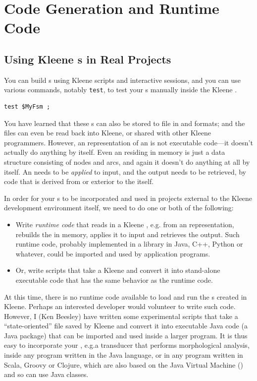 \chapter{Code Generation and Runtime Code}

\label{chapt:coderuntime}

\section{Using Kleene \fsm{}s in Real Projects}

 
You can build \fsm{}s using Kleene scripts and interactive  sessions,
and you can
use various commands, notably \texttt{test}, to 
test your \fsm{}s manually inside the Kleene .


\begin{Verbatim}
test $MyFsm ;
\end{Verbatim}

\noindent
You have learned that these \fsm{}s can also be stored to file in  and \xml{}
formats; and the \xml{} files can even be read back into Kleene, or shared with other
Kleene programmers.  However, an  representation of
an \fsm{} is not executable code---it doesn't actually do anything by itself.  Even an
\fsm{} residing in memory is just a data structure consisting of nodes and arcs, and again it
doesn't do anything at all by itself.  An \fsm{} needs to be \emph{applied} to input, and
the output needs to be retrieved, by code that is derived from or exterior to the \fsm{} itself.

In order for your \fsm{}s to
be incorporated and used in projects external to the Kleene development environment itself,
we need to do one or both of the following:

\begin{itemize}
\item
Write \emph{runtime code} that reads in a Kleene \fsm{}, e.g.\@
from an  representation, 
rebuilds the \fsm{} in memory, applies it to input and retrieves the output.
Such runtime code, probably implemented in a library in Java, C++, Python or whatever, could be
imported and used by application programs.
\item
Or, write scripts that take a Kleene \fsm{} and convert it into stand-alone
executable code that has the same behavior as the runtime code.
\end{itemize}

At this time, there is no runtime code available to load and run the \fsm{}s created
in Kleene.  Perhaps an interested developer would volunteer to write such code.  However, I (Ken
Beesley) have written some experimental  scripts that take a ``state-oriented''
 file saved by Kleene and convert it into executable Java code (a Java package)
that can be imported
and used inside a larger program.  It is thus easy to incorporate your \fsm{}, e.g.\@ a
transducer that performs morphological analysis, inside any program written in the Java language,
or in any program written in Scala, Groovy or Clojure, which are also based on the Java Virtual Machine
() and so can use Java classes.

